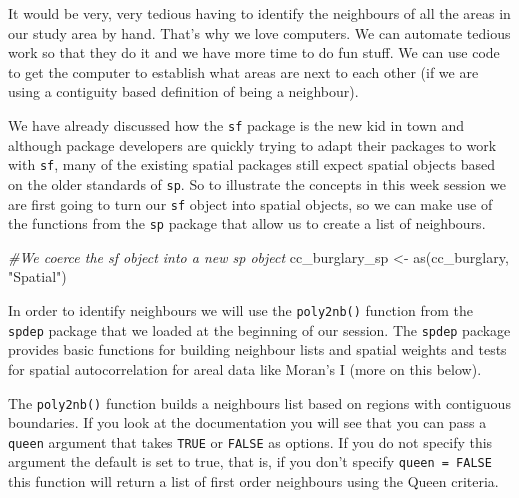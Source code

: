 \documentclass[
  krantz2]{krantz}
\makeatletter
\newenvironment{Shaded}{\begin{snugshade}}{\end{snugshade}}
\newcommand{\AttributeTok}[1]{\textcolor[rgb]{0.61,0.61,0.61}{#1}}
\newcommand{\CommentTok}[1]{\textcolor[rgb]{0.37,0.37,0.37}{\textit{#1}}}
\newcommand{\FunctionTok}[1]{\textcolor[rgb]{0,0,0}{#1}}
\newcommand{\NormalTok}[1]{#1}
\newcommand{\OtherTok}[1]{\textcolor[rgb]{0.37,0.37,0.37}{#1}}
\newcommand{\SpecialCharTok}[1]{\textcolor[rgb]{0,0,0}{#1}}
\newcommand{\StringTok}[1]{\textcolor[rgb]{0.5,0.5,0.5}{#1}}
\newenvironment{kframe}{%
\medskip{}
\setlength{\fboxsep}{.8em}
 \def\at@end@of@kframe{}%
 \ifinner\ifhmode%
  \def\at@end@of@kframe{\end{minipage}}%
  \begin{minipage}{\columnwidth}%
 \fi\fi%
 \def\FrameCommand##1{\hskip\@totalleftmargin \hskip-\fboxsep
 \colorbox{shadecolor}{##1}\hskip-\fboxsep
     \hskip-\linewidth \hskip-\@totalleftmargin \hskip\columnwidth}%
 \MakeFramed {\advance\hsize-\width
   \@totalleftmargin\z@ \linewidth\hsize
   \@setminipage}}%
 {\par\unskip\endMakeFramed%
 \at@end@of@kframe}
\renewenvironment{Shaded}{\begin{kframe}}{\end{kframe}}
\makeatother
\begin{document}
It would be very, very tedious having to identify the neighbours of all the areas in our study area by hand. That's why we love computers. We can automate tedious work so that they do it and we have more time to do fun stuff. We can use code to get the computer to establish what areas are next to each other (if we are using a contiguity based definition of being a neighbour).

We have already discussed how the \texttt{sf} package is the new kid in town and although package developers are quickly trying to adapt their packages to work with \texttt{sf}, many of the existing spatial packages still expect spatial objects based on the older standards of \texttt{sp}. So to illustrate the concepts in this week session we are first going to turn our \texttt{sf} object into spatial objects, so we can make use of the functions from the \texttt{sp} package that allow us to create a list of neighbours.

\begin{Shaded}
\begin{Highlighting}[]
\CommentTok{\#We coerce the sf object into a new sp object}
\NormalTok{cc\_burglary\_sp }\OtherTok{\textless{}{-}} \FunctionTok{as}\NormalTok{(cc\_burglary, }\StringTok{"Spatial"}\NormalTok{)}
\end{Highlighting}
\end{Shaded}

In order to identify neighbours we will use the \texttt{poly2nb()} function from the \texttt{spdep} package that we loaded at the beginning of our session. The \texttt{spdep} package provides basic functions for building neighbour lists and spatial weights and tests for spatial autocorrelation for areal data like Moran's I (more on this below).

The \texttt{poly2nb()} function builds a neighbours list based on regions with contiguous boundaries. If you look at the documentation you will see that you can pass a \texttt{queen} argument that takes \texttt{TRUE} or \texttt{FALSE} as options. If you do not specify this argument the default is set to true, that is, if you don't specify \texttt{queen\ =\ FALSE} this function will return a list of first order neighbours using the Queen criteria.

\begin{Shaded}
\end{Shaded}
\end{document}
